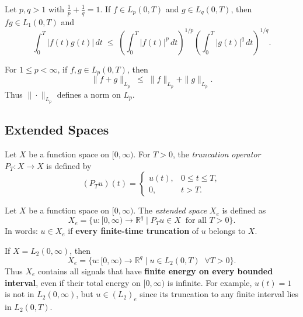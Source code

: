 \begin{proposition}
Let $p,q > 1$ with $\tfrac{1}{p}+\tfrac{1}{q}=1$.  
If $f \in L_p(0,T)$ and $g \in L_q(0,T)$, then $fg \in L_1(0,T)$ and 
\begin{equation}
\int_{0}^{T} |f(t)g(t)| \, dt 
\;\leq\;
\left( \int_{0}^{T} |f(t)|^p \, dt \right)^{1/p}
\left( \int_{0}^{T} |g(t)|^q \, dt \right)^{1/q}.
\end{equation}
\end{proposition}

\begin{proposition}
For $1 \leq p < \infty$, if $f,g \in L_p(0,T)$, then
\begin{equation}
\|f+g\|_{L_p} \;\leq\; \|f\|_{L_p} + \|g\|_{L_p}.
\end{equation}
Thus $\|\cdot\|_{L_p}$ defines a norm on $L_p$.
\end{proposition}

\subsection{Extended Spaces}

\begin{definition}
Let $X$ be a function space on $[0,\infty)$.  
For $T>0$, the \emph{truncation operator} $P_T:X \to X$ is defined by
\begin{equation}
(P_Tu)(t) =
\begin{cases}
u(t), & 0 \leq t \leq T,\\[6pt]
0, & t > T.
\end{cases}
\end{equation}
\end{definition}

\begin{definition}
Let $X$ be a function space on $[0,\infty)$.  
The \emph{extended space} $X_e$ is defined as
\begin{equation}
X_e = \big\{ u:[0,\infty)\to\mathbb{R}^q \;\big|\; 
P_T u \in X \;\; \text{for all } T>0 \big\}.
\end{equation}
In words: $u \in X_e$ if \textbf{every finite-time truncation} of $u$ belongs to $X$.
\end{definition}

\begin{example}
If $X = L_2(0,\infty)$, then
\begin{equation}
X_e = \{ u:[0,\infty)\to \mathbb{R}^q \mid u \in L_2(0,T) \;\;\forall T>0\}.
\end{equation}
Thus $X_e$ contains all signals that have \textbf{finite energy on every bounded interval}, even if their total energy on $[0,\infty)$ is infinite.  
For example, $u(t)=1$ is not in $L_2(0,\infty)$, but $u \in (L_2)_e$ since its truncation to any finite interval lies in $L_2(0,T)$.
\end{example}


